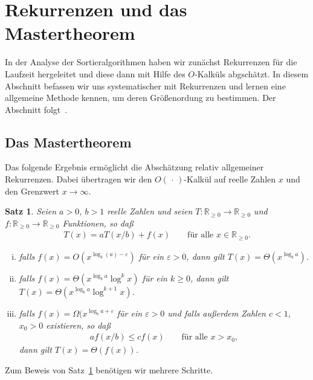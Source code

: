 \documentclass[10pt,reqno]{amsart}
\numberwithin{equation}{section}
\newcommand\nix{\,\cdot\,}
\newcommand\RRpos{\mathbb R_{\geq0}}
\newtheorem{theorem}[definition]{Satz}
\newcommand\eps{\varepsilon}
\newcommand\Thm{Satz}
\begin{document}
\section{Rekurrenzen und das Mastertheorem}\label{sec_rec}

In der Analyse der Sortieralgorithmen haben wir zun\"achst Rekurrenzen f\"ur die Laufzeit hergeleitet und diese dann mit Hilfe des $O$-Kalk\"uls abgsch\"atzt.
In diesem Abschnitt befassen wir uns systematischer mit Rekurrenzen und lernen eine allgemeine Methode kennen, um deren Gr\"o\ss enordung zu bestimmen.
Der Abschnitt folgt~\cite{Cormen}.

\subsection{Das Mastertheorem}\label{sec_master}
Das folgende Ergebnis erm\"oglicht die Absch\"atzung relativ allgemeiner Rekurrenzen.
Dabei \"ubertragen wir den $O(\nix)$-Kalk\"ul auf reelle Zahlen $x$ und den Grenzwert $x\to\infty$.

\begin{theorem}\label{thm_master}
	Seien $a>0$, $b>1$ reelle Zahlen und seien $T:\RRpos\to\RRpos$ und $f:\RRpos\to\RRpos$ Funktionen, so da\ss
	\begin{align*}
		T(x)=aT(x/b)+f(x)\qquad\mbox{f\"ur alle }x\in\RRpos.
	\end{align*}
	\begin{enumerate}[(i)]
		\item falls $f(x)=O(x^{\log_b(a)-\eps})$ f\"ur ein $\eps>0$, dann gilt $T(x)=\Theta(x^{\log_ba})$.
		\item falls $f(x)=\Theta(x^{\log_ba}\log^kx)$ f\"ur ein $k\geq0$, dann gilt $T(x)=\Theta(x^{\log_ba}\log^{k+1}x)$.
		\item falls $f(x)=\Omega(x^{\log_ba+\eps}$ f\"ur ein $\eps>0$ und falls au\ss erdem  Zahlen $c<1$, $x_0>0$ existieren, so da\ss
			\begin{align*}
				af(x/b)\leq cf(x)\qquad\mbox{f\"ur alle }x>x_0,
			\end{align*}
			dann gilt $T(x)=\Theta(f(x))$.
	\end{enumerate}
\end{theorem}

Zum Beweis von \Thm~\ref{thm_master} ben\"otigen wir mehrere Schritte.
\end{document}
